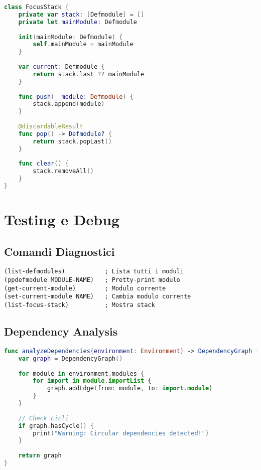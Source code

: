 \begin{lstlisting}[language=Swift]
class FocusStack {
    private var stack: [Defmodule] = []
    private let mainModule: Defmodule
    
    init(mainModule: Defmodule) {
        self.mainModule = mainModule
    }
    
    var current: Defmodule {
        return stack.last ?? mainModule
    }
    
    func push(_ module: Defmodule) {
        stack.append(module)
    }
    
    @discardableResult
    func pop() -> Defmodule? {
        return stack.popLast()
    }
    
    func clear() {
        stack.removeAll()
    }
}
\end{lstlisting}

\section{Testing e Debug}

\subsection{Comandi Diagnostici}

\begin{lstlisting}[language=CLIPS]
(list-defmodules)           ; Lista tutti i moduli
(ppdefmodule MODULE-NAME)   ; Pretty-print modulo
(get-current-module)        ; Modulo corrente
(set-current-module NAME)   ; Cambia modulo corrente
(list-focus-stack)          ; Mostra stack
\end{lstlisting}

\subsection{Dependency Analysis}

\begin{lstlisting}[language=Swift]
func analyzeDependencies(environment: Environment) -> DependencyGraph {
    var graph = DependencyGraph()
    
    for module in environment.modules {
        for import in module.importList {
            graph.addEdge(from: module, to: import.module)
        }
    }
    
    // Check cicli
    if graph.hasCycle() {
        print("Warning: Circular dependencies detected!")
    }
    
    return graph
}
\end{lstlisting}


